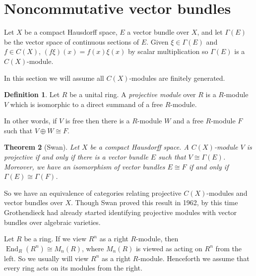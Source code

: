 \documentclass[12pt]{report}
\newcommand{\End}{\operatorname{End}}
\newcommand{\dfn}[1]{\emph{#1}\index{#1}}
\newtheorem{theorem}{Theorem}[chapter]
\theoremstyle{definition}
\newtheorem{definition}[theorem]{Definition}
\begin{document}
\section{Noncommutative vector bundles}
    Let $X$ be a compact Hausdorff space, $E$ a vector bundle over $X$, and let $\Gamma(E)$ be the vector space of continuous sections of $E$. Given $\xi \in \Gamma(E)$ and $f \in C(X)$, $(f\xi)(x) = f(x)\xi(x)$ by scalar multiplication so $\Gamma(E)$ is a $C(X)$-module. 

    In this section we will assume all $C(X)$-modules are finitely generated.
\begin{definition}
    Let $R$ be a unital ring. A \dfn{projective module} over $R$ is a $R$-module $V$ which is isomorphic to a direct summand of a free $R$-module.
\end{definition}
    In other words, if $V$ is free then there is a $R$-module $W$ and a free $R$-module $F$ such that $V \oplus W \cong F$.
\begin{theorem}[Swan]
    Let $X$ be a compact Hausdorff space. A $C(X)$-module $V$ is projective if and only if there is a vector bundle $E$ such that $V \cong \Gamma(E)$. Moreover, we have an isomorphism of vector bundles $E \cong F$ if and only if $\Gamma(E) \cong \Gamma(F)$.
\end{theorem}
    So we have an equivalence of categories relating projective $C(X)$-modules and vector bundles over $X$. Though Swan proved this result in 1962, by this time Grothendieck had already started identifying projective modules with vector bundles over algebraic varieties.

    Let $R$ be a ring. If we view $R^n$ as a right $R$-module, then $\End_R(R^n) \cong M_n(R)$, where $M_n(R)$ is viewed as acting on $R^n$ from the left. So we usually will view $R^n$ as a right $R$-module. Henceforth we assume that every ring acts on its modules from the right.
\end{document}
